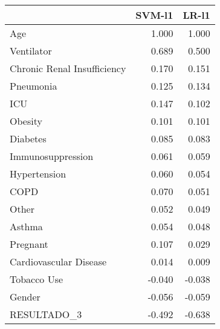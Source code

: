 \begin{tabular}{lrr}
\toprule
{} &  SVM-l1 &  LR-l1 \\
\midrule
Age                         &   1.000 &  1.000 \\
Ventilator                  &   0.689 &  0.500 \\
Chronic Renal Insufficiency &   0.170 &  0.151 \\
Pneumonia                   &   0.125 &  0.134 \\
ICU                         &   0.147 &  0.102 \\
Obesity                     &   0.101 &  0.101 \\
Diabetes                    &   0.085 &  0.083 \\
Immunosuppression           &   0.061 &  0.059 \\
Hypertension                &   0.060 &  0.054 \\
COPD                        &   0.070 &  0.051 \\
Other                       &   0.052 &  0.049 \\
Asthma                      &   0.054 &  0.048 \\
Pregnant                    &   0.107 &  0.029 \\
Cardiovascular Disease      &   0.014 &  0.009 \\
Tobacco Use                 &  -0.040 & -0.038 \\
Gender                      &  -0.056 & -0.059 \\
RESULTADO\_3                 &  -0.492 & -0.638 \\
\bottomrule
\end{tabular}
